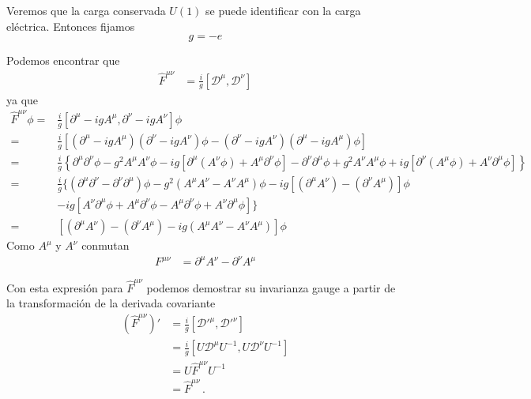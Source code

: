 Veremos que la carga conservada $U(1)$ se puede identificar con la carga el\'ectrica. Entonces fijamos
\begin{equation}
  g=-e
\end{equation}


Podemos encontrar que
\begin{align}
  \label{eq:67}
  \widehat{F}^{\mu\nu}&=\frac{i}{g}[\mathcal{D}^\mu,\mathcal{D}^\nu]
\end{align}
ya que
\begin{align}
  \label{eq:164}
   \widehat{F}^{\mu\nu}\phi =&\frac{i}{g}[\partial^\mu-igA^\mu,\partial^\nu-igA^\nu]\phi\nonumber\\
  =&\frac{i}{g}\left[\left(\partial^\mu-igA^\mu\right)\left(\partial^\nu-igA^\nu\right)\phi
    -\left(\partial^\nu-igA^\nu\right)\left(\partial^\mu-igA^\mu\right)\phi\right]\nonumber\\
  =&\frac{i}{g}\left\{\partial^\mu\partial^\nu\phi-g^2A^\mu A^\nu\phi-ig[\partial^\mu(A^\nu\phi)+A^\mu\partial^\nu\phi]
    -\partial^\nu\partial^\mu\phi+g^2A^\nu A^\mu\phi+ig[\partial^\nu(A^\mu\phi)+A^\nu\partial^\mu\phi]\right\}\nonumber\\
  =&\frac{i}{g}\{(\partial^\mu\partial^\nu-\partial^\nu\partial^\mu)\phi-g^2(A^\mu A^\nu-A^\nu A^\mu)\phi
  -ig[(\partial^\mu A^\nu)-(\partial^\nu A^\mu)]\phi\nonumber\\
  &-ig[A^\nu\partial^\mu\phi+A^\mu\partial^\nu\phi-A^\mu\partial^\nu\phi+A^\nu\partial^\mu\phi]\}\nonumber\\
=&[(\partial^\mu A^\nu)-(\partial^\nu A^\mu)-ig(A^\mu A^\nu-A^\nu A^\mu)]\phi
\end{align}
Como $A^\mu$ y $A^\nu$ conmutan
\begin{align}
   F^{\mu\nu}&=\partial^\mu A^\nu-\partial^\nu A^\mu
\end{align}

Con esta expresi\'on para $\widehat{F}^{\mu\nu}$ podemos demostrar su invarianza gauge a partir de la transformaci\'on de la derivada covariante
\begin{align}
  \label{eq:68}
  \left(
    \widehat{F}^{\mu\nu}
  \right)'&=\frac{i}{g}\left[{\mathcal{D}'}^\mu,{\mathcal{D}'}^\nu\right]\nonumber\\
&=\frac{i}{g}\left[U{\mathcal{D}}^\mu U^{-1},U{\mathcal{D}}^\nu U^{-1}\right]\nonumber\\
&=U\widehat{F}^{\mu\nu}U^{-1}\nonumber\\
  &=\widehat{F}^{\mu\nu}\,.
\end{align}

